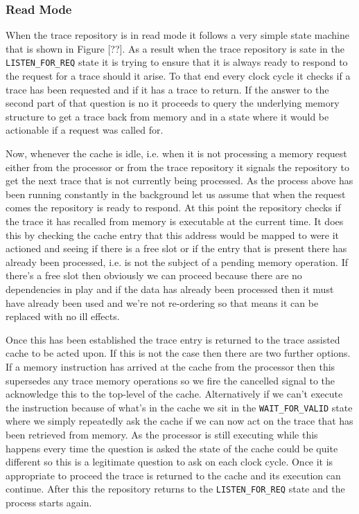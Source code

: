 \subsubsection{Read Mode}
\label{subsec:read-mode}

When the trace repository is in read mode it follows a very simple state machine that is shown in Figure [??]. As a result when the trace repository is sate in the \texttt{LISTEN\_FOR\_REQ} state it is trying to ensure that it is always ready to respond to the request for a trace should it arise. To that end every clock cycle it checks if a trace has been requested and if it has a trace to return. If the answer to the second part of that question is no it proceeds to query the underlying memory structure to get a trace back from memory and in a state where it would be actionable if a request was called for. 

Now, whenever the cache is idle, i.e. when it is not processing a memory request either from the processor or from the trace repository it signals the repository to get the next trace that is not currently being processed. As the process above has been running constantly in the background let us assume that when the request comes the repository is ready to respond. At this point the repository checks if the trace it has recalled from memory is executable at the current time. It does this by checking the cache entry that this address would be mapped to were it actioned and seeing if there is a free slot or if the entry that is present there has already been processed, i.e. is not the subject of a pending memory operation. If there's a free slot then obviously we can proceed because there are no dependencies in play and if the data has already been processed then it must have already been used and we're not re-ordering so that means it can be replaced with no ill effects. 

Once this has been established the trace entry is returned to the trace assisted cache to be acted upon. If this is not the case then there are two further options. If a memory instruction has arrived at the cache from the processor then this supersedes any trace memory operations so we fire the cancelled signal to the acknowledge this to the top-level of the cache. Alternatively if we can't execute the instruction because of what's in the cache we sit in the \texttt{WAIT\_FOR\_VALID} state where we simply repeatedly ask the cache if we can now act on the trace that has been retrieved from memory. As the processor is still executing while this happens every time the question is asked the state of the cache could be quite different so this is a legitimate question to ask on each clock cycle. Once it is appropriate to proceed the trace is returned to the cache and its execution can continue. After this the repository returns to the \texttt{LISTEN\_FOR\_REQ} state and the process starts again.

